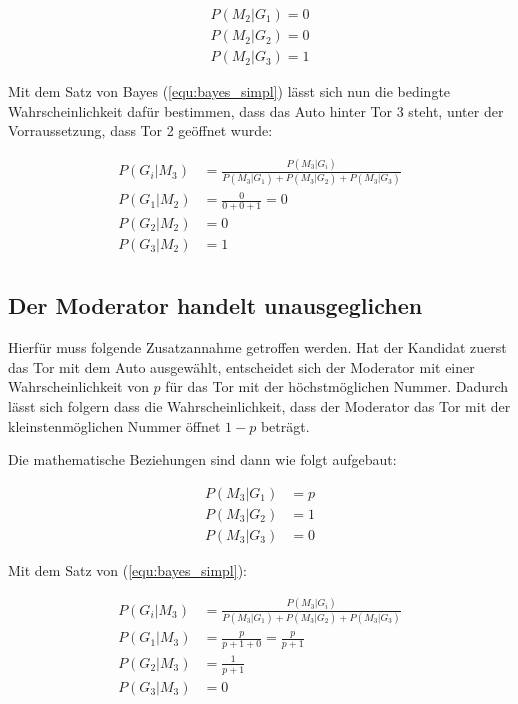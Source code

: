 \begin{align*}
    P(M_2 | G_1) = 0 \\
    P(M_2 | G_2) = 0 \\
    P(M_2 | G_3) = 1
\end{align*}

Mit dem Satz von Bayes (\autoref{equ:bayes_simpl}) lässt sich nun die bedingte Wahrscheinlichkeit dafür bestimmen, dass das Auto hinter Tor 3 steht, unter der Vorraussetzung, dass Tor 2 geöffnet wurde:

\begin{align*}
    P(G_i | M_3) & = \frac{P(M_3 | G_i)}{P(M_3 | G_1) + P(M_3 | G_2) + P(M_3 | G_3)} \\
    P(G_1 | M_2) & = \frac{0}{0+0+1} = 0                                             \\
    P(G_2 | M_2) & = 0                                                               \\
    P(G_3 | M_2) & = 1                                                               \\
\end{align*}


\subsection{Der Moderator handelt unausgeglichen}

Hierfür muss folgende Zusatzannahme getroffen werden. Hat der Kandidat zuerst das Tor mit dem Auto ausgewählt, entscheidet sich der Moderator mit einer Wahrscheinlichkeit von $p$
für das Tor mit der höchstmöglichen Nummer. Dadurch lässt sich folgern dass die Wahrscheinlichkeit, dass der Moderator das Tor mit der kleinstenmöglichen Nummer öffnet $1 - p$ beträgt.

Die mathematische Beziehungen sind dann wie folgt aufgebaut:

\begin{align*}
    P(M_3 | G_1) & = p \\
    P(M_3 | G_2) & = 1 \\
    P(M_3 | G_3) & = 0
\end{align*}

Mit dem Satz von  (\autoref{equ:bayes_simpl}):

\begin{align*}
    P(G_i | M_3) & = \frac{P(M_3 | G_i)}{P(M_3 | G_1) + P(M_3 | G_2) + P(M_3 | G_3)} \\
    P(G_1 | M_3) & = \frac{p}{p+1+0} = \frac{p}{p+1}                                 \\
    P(G_2 | M_3) & = \frac{1}{p+1}                                                   \\
    P(G_3 | M_3) & = 0                                                               \\
\end{align*}

